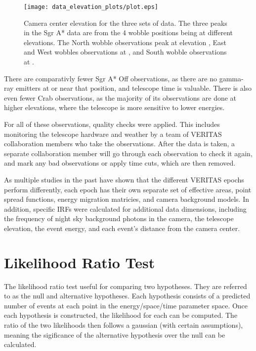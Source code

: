   \begin{figure}[ht]
    \centering
    \texttt{[image: data\_elevation\_plots/plot.eps]}
    \caption[VERITAS Data Elevation Exposure]{
      Camera center elevation for the three sets of data.
      The three peaks in the Sgr A* data are from the 4 wobble positions being at different elevations.
      The North wobble observations peak at elevation \degree, East and West wobbles observations at \degree, and South wobble observations at \degree.
    }
    \label{fig:datapointingelevations}
  \end{figure}

  There are comparativly fewer Sgr A* Off observations, as there are no gamma-ray emitters at or near that position, and telescope time is valuable.
  There is also even fewer Crab observations, as the majority of its observations are done at higher elevations, where the telescope is more sensitive to lower energies.
  
  For all of these observations, quality checks were applied.
  This includes monitoring the telescope hardware and weather by a team of VERITAS collaboration members who take the observations.
  After the data is taken, a separate collaboration member will go through each observation to check it again, and mark any bad observations or apply time cuts, which are then removed.

  As multiple studies in the past have shown that the different VERITAS epochs perform differently, each epoch has their own separate set of effective areas, point spread functions, energy migration matricies, and camera background models.
  In addition, specific IRFs were calculated for additional data dimensions, including the frequency of night sky background photons in the camera, the telescope elevation, the event energy, and each event's distance from the camera center.

\section{Likelihood Ratio Test}
  The likelihood ratio test useful for comparing two hypotheses.
  They are referred to as the null and alternative hypotheses.
  Each hypothesis consists of a predicted number of events at each point in the energy/space/time parameter space.
  Once each hypothesis is constructed, the likelihood for each can be computed.
  The ratio of the two likelihoods then follows a gaussian (with certain assumptions), meaning the sigificance of the alternative hypothesis over the null can be calculated.

